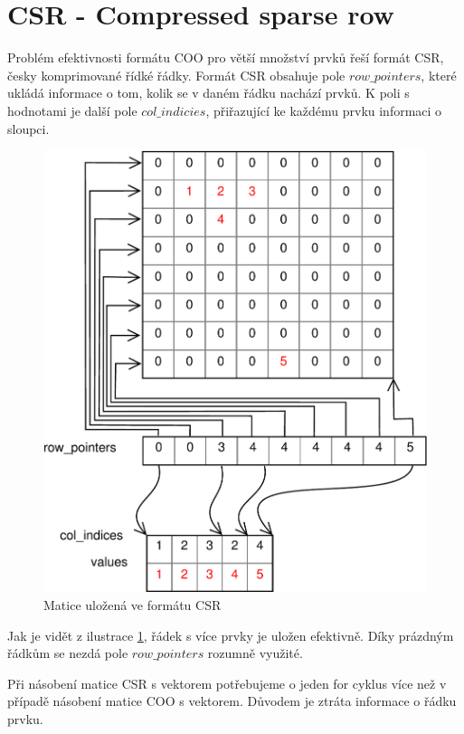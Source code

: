 \section{CSR - Compressed sparse row}

Problém efektivnosti formátu COO pro větší množství prvků řeší formát CSR, česky komprimované řídké řádky. Formát CSR obsahuje pole $row\_pointers$, které ukládá informace o tom, kolik se v daném řádku nachází prvků. K poli s hodnotami je další pole $col\_indicies$, přiřazující ke každému prvku informaci o sloupci.

\begin{figure}[H]\centering
	\includegraphics[width=\textwidth]{./images/csr/csr}
	\caption{Matice uložená ve formátu CSR}
	\label{fig:CSR}
\end{figure}

Jak je vidět z ilustrace \ref{fig:CSR}, řádek s více prvky je uložen efektivně. Díky prázdným řádkům se nezdá pole $row\_pointers$ rozumně využité.

Při násobení matice CSR s vektorem potřebujeme o jeden for cyklus více než v případě násobení matice COO s vektorem. Důvodem je ztráta informace o řádku prvku.

